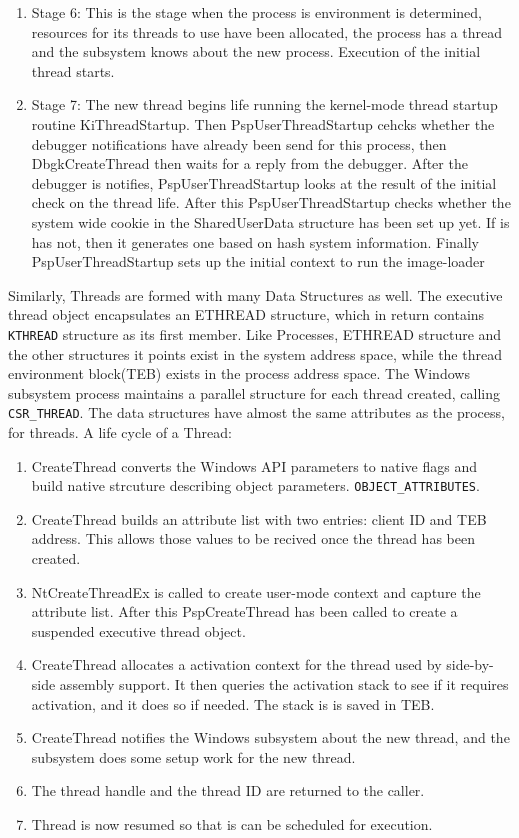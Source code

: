 \documentclass[letterpaper,10pt,draftclsnofoot,onecolumn]{IEEEtran}
\begin{document}
\begin{enumerate}
\item Stage 6: This is the stage when the process is environment is determined, resources for its threads to use have been allocated, the process has a thread and the subsystem knows about the new process. Execution of the initial thread starts.
\item Stage 7: The new thread begins life running the kernel-mode thread startup routine KiThreadStartup. Then PspUserThreadStartup cehcks whether the debugger notifications have already been send for this process, then DbgkCreateThread then waits for a reply from the debugger. After the debugger is notifies, PspUserThreadStartup looks at the result of the initial check on the thread life. After this PspUserThreadStartup checks whether the system wide cookie in the SharedUserData structure has been set up yet. If is has not, then it generates one based on hash system information. Finally PspUserThreadStartup sets up the initial context to run the image-loader\cite{[1]}\\
\end{enumerate}
Similarly, Threads are formed with many Data Structures as well. The executive thread object encapsulates an ETHREAD structure, which in return contains \verb|KTHREAD| structure as its first member. Like Processes, ETHREAD structure and the other structures it points exist in the system address space, while the thread environment block(TEB) exists in the process address space. The Windows subsystem process maintains a parallel structure for each thread created, calling \verb|CSR_THREAD|. The data structures have almost the same attributes as the process, for threads.
A life cycle of a Thread:
\begin{enumerate}
\item CreateThread converts the Windows API parameters to native flags and build native strcuture describing object parameters. \verb|OBJECT_ATTRIBUTES|.
\item CreateThread builds an attribute list with two entries: client ID and TEB address. This allows those values to be recived once the thread has been created.
\item NtCreateThreadEx is called to create user-mode context and capture the attribute list. After this PspCreateThread has been called to create a suspended executive thread object.
\item CreateThread allocates a activation context for the thread used by side-by-side assembly support. It then queries the activation stack to see if it requires activation, and it does so if needed. The stack is is saved in TEB.
\item CreateThread notifies the Windows subsystem about the new thread, and the subsystem does some setup work for the new thread.
\item The thread handle and the thread ID are returned to the caller.
\item Thread is now resumed so that is can be scheduled for execution. \cite{[1]}
\end{enumerate}
\end{document}
